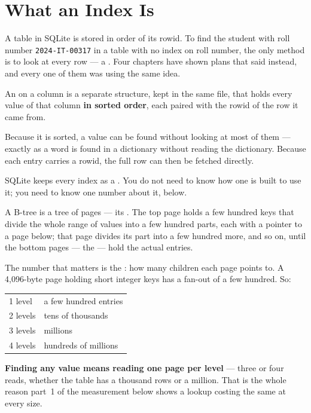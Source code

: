 \section{What an Index Is}

A table in SQLite is stored in order of its rowid. To find the student with
roll number \texttt{2024-IT-00317} in a table with no index on roll number,
the only method is to look at every row --- a . Four chapters have
shown plans that said  instead, and every one of them was using
the same idea.

\begin{definitionbox}[Index]
An  on a column is a separate structure, kept in the same file,
that holds every value of that column \textbf{in sorted order}, each paired
with the rowid of the row it came from.

\smallskip
Because it is sorted, a value can be found without looking at most of them ---
exactly as a word is found in a dictionary without reading the dictionary.
Because each entry carries a rowid, the full row can then be fetched directly.

\smallskip
SQLite keeps every index as a . You do not need to know how one is
built to use it; you need to know one number about it, below.
\end{definitionbox}

\begin{conceptbox}
A B-tree is a tree of pages --- its . The top page holds a few hundred keys that divide
the whole range of values into a few hundred parts, each with a pointer to a
page below; that page divides its part into a few hundred more, and so on,
until the bottom pages --- the  --- hold the actual entries.

\smallskip
The number that matters is the : how many children each page
points to. A 4{,}096-byte page holding short integer keys has a fan-out of a
few hundred. So:

\begin{tabular}{@{}L{3.6cm}L{10.2cm}@{}}
1 level   & a few hundred entries \\
2 levels  & tens of thousands \\
3 levels  & millions \\
4 levels  & hundreds of millions \\
\end{tabular}

\smallskip
\textbf{Finding any value means reading one page per level} --- three or four
reads, whether the table has a thousand rows or a million. That is the whole
reason part~1 of the measurement below shows a lookup costing the same at every
size.
\end{conceptbox}

